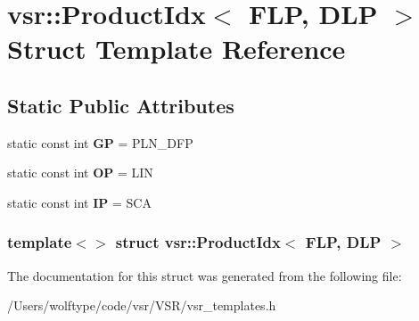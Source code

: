 \hypertarget{structvsr_1_1_product_idx_3_01_f_l_p_00_01_d_l_p_01_4}{\section{vsr\-:\-:Product\-Idx$<$ F\-L\-P, D\-L\-P $>$ Struct Template Reference}
\label{structvsr_1_1_product_idx_3_01_f_l_p_00_01_d_l_p_01_4}
}
\subsection*{Static Public Attributes}
\begin{DoxyCompactItemize}
\item 
\hypertarget{structvsr_1_1_product_idx_3_01_f_l_p_00_01_d_l_p_01_4_a977ab3f8389edd274b70ff494d460299}{static const int {\bfseries G\-P} = P\-L\-N\-\_\-\-D\-F\-P}\label{structvsr_1_1_product_idx_3_01_f_l_p_00_01_d_l_p_01_4_a977ab3f8389edd274b70ff494d460299}

\item 
\hypertarget{structvsr_1_1_product_idx_3_01_f_l_p_00_01_d_l_p_01_4_a9b6fe576f020cbd7feff4afde365dca4}{static const int {\bfseries O\-P} = L\-I\-N}\label{structvsr_1_1_product_idx_3_01_f_l_p_00_01_d_l_p_01_4_a9b6fe576f020cbd7feff4afde365dca4}

\item 
\hypertarget{structvsr_1_1_product_idx_3_01_f_l_p_00_01_d_l_p_01_4_a2bf92e43aa1b4c30e1588a56f7d75564}{static const int {\bfseries I\-P} = S\-C\-A}\label{structvsr_1_1_product_idx_3_01_f_l_p_00_01_d_l_p_01_4_a2bf92e43aa1b4c30e1588a56f7d75564}

\end{DoxyCompactItemize}
\subsubsection*{template$<$$>$ struct vsr\-::\-Product\-Idx$<$ F\-L\-P, D\-L\-P $>$}



The documentation for this struct was generated from the following file\-:\begin{DoxyCompactItemize}
\item 
/\-Users/wolftype/code/vsr/\-V\-S\-R/vsr\-\_\-templates.\-h\end{DoxyCompactItemize}
